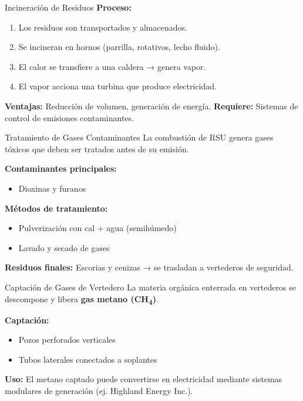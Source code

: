 \documentclass[../../main.tex]{subfiles}
\begin{document}
\begin{frame}{Incineración de Residuos}
\justifying
\textbf{Proceso:}
\begin{enumerate}
  \item Los residuos son transportados y almacenados.
  \item Se incineran en hornos (parrilla, rotativos, lecho fluido).
  \item El calor se transfiere a una caldera → genera vapor.
  \item El vapor acciona una turbina que produce electricidad.
\end{enumerate}

\vspace{0.5em}
\textbf{Ventajas:} Reducción de volumen, generación de energía.
\textbf{Requiere:} Sistemas de control de emisiones contaminantes.
\end{frame}
\begin{frame}{Tratamiento de Gases Contaminantes}
\justifying
La combustión de RSU genera gases tóxicos que deben ser tratados antes de su emisión.

\vspace{0.5em}
\textbf{Contaminantes principales:}
\begin{itemize}
  \item Dioxinas y furanos
\end{itemize}

\vspace{0.5em}
\textbf{Métodos de tratamiento:}
\begin{itemize}
  \item Pulverización con cal + agua (semihúmedo)
  \item Lavado y secado de gases
\end{itemize}

\vspace{0.5em}
\textbf{Residuos finales:} Escorias y cenizas → se trasladan a vertederos de seguridad.
\end{frame}
\begin{frame}{Captación de Gases de Vertedero}
\justifying
La materia orgánica enterrada en vertederos se descompone y libera \textbf{gas metano (CH\textsubscript{4})}.

\vspace{0.5em}
\textbf{Captación:}
\begin{itemize}
  \item Pozos perforados verticales
  \item Tubos laterales conectados a soplantes
\end{itemize}

\vspace{0.5em}
\textbf{Uso:} El metano captado puede convertirse en electricidad mediante sistemas modulares de generación (ej. Highland Energy Inc.).
\end{frame}
\end{document}
